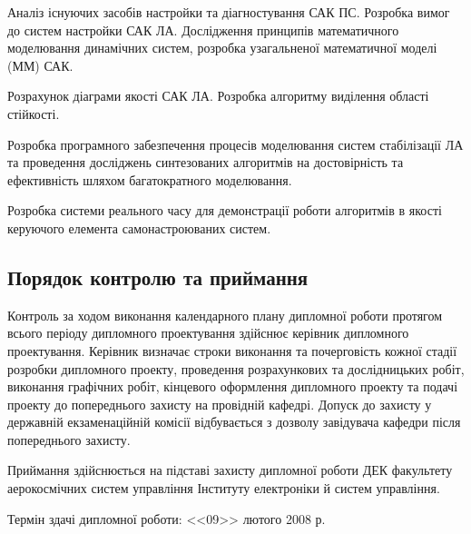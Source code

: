 \documentclass[ukrainian,utf8]{eskdtext}
\begin{document}
Аналіз існуючих засобів настройки та діагностування САК ПС. Розробка 
вимог до систем настройки САК ЛА. Дослідження принципів математичного 
моделювання динамічних систем, розробка узагальненої математичної моделі 
(ММ) САК. 

Розрахунок діаграми якості САК ЛА. Розробка алгоритму виділення області 
стійкості.

Розробка програмного забезпечення процесів моделювання систем стабілізації 
ЛА та проведення досліджень синтезованих алгоритмів на достовірність та 
ефективність шляхом багатократного моделювання.

Розробка системи реального часу для демонстрації роботи алгоритмів в 
якості керуючого елемента самонастроюваних систем.

\subsection*{Порядок контролю та приймання}
Контроль за ходом виконання календарного плану дипломної роботи протягом 
всього періоду дипломного проектування здійснює керівник дипломного 
проектування. Керівник визначає строки виконання та почерговість кожної 
стадії розробки дипломного проекту, проведення розрахункових та 
дослідницьких робіт, виконання графічних робіт, кінцевого оформлення 
дипломного проекту та подачі проекту до попереднього захисту  на провідній 
кафедрі. Допуск до захисту у державній екзаменаційній комісії відбувається 
з дозволу завідувача кафедри після попереднього захисту.

Приймання здійснюється на підставі захисту дипломної роботи ДЕК факультету 
аерокосмічних систем управління Інституту електроніки й систем управління.

Термін здачі дипломної роботи: <<09>> лютого 2008 р.
\end{document}
